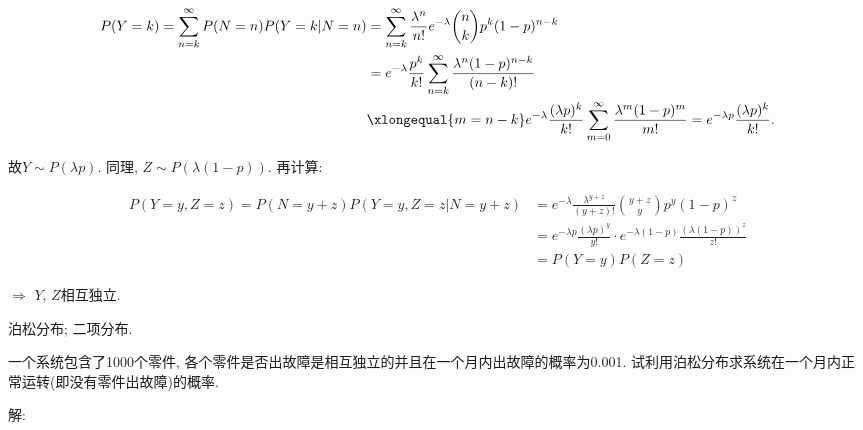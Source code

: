 \documentclass[standard]{ExBook}
\begin{document}
\begin{qitems}
    \begin{bbox}
\vspace{-2em}
\begin{center}
\begin{equation}
\begin{aligned}
    \nonumber
P(Y=k)=\sum\limits_{n=k}^{\infty}P(N=n)P(Y=k|N=n) & =\sum\limits_{n=k}^{\infty}\frac{\lambda^n}{n!}e^{-\lambda}\binom{n}{k}p^{k}(1-p)^{n-k}\\
 & =e^{-\lambda}\frac{p^k}{k!}\sum\limits_{n=k}^{\infty}\frac{\lambda^{n}(1-p)^{n-k}}{(n-k)!}\\
 & \xlongequal{m=n-k} e^{-\lambda}\frac{(\lambda p)^k}{k!}\sum\limits_{m=0}^{\infty}\frac{\lambda^{m}(1-p)^{m}}{m!} = e^{-\lambda p}\frac{(\lambda p)^{k}}{k!}.
\end{aligned}
\end{equation}
\end{center}
故$Y\sim P(\lambda p)$. 同理, $Z\sim P(\lambda(1-p))$.
再计算:
\vspace{-2em}
\begin{center}
\begin{equation}
\begin{aligned}
    \nonumber
P(Y=y,Z=z)=P(N=y+z)P(Y=y,Z=z|N=y+z)&=e^{-\lambda}\frac{\lambda^{y+z}}{(y+z)!}\binom{y+z}{y}p^y(1-p)^z\\
&=e^{-\lambda p}\frac{(\lambda p)^y}{y!}\cdot e^{-\lambda(1-p)}\frac{(\lambda(1-p))^z}{z!}\\
&=P(Y=y)P(Z=z)
\end{aligned}
\end{equation}
\end{center}
$\Longrightarrow$ $Y$, $Z$相互独立.

\textcolor{themeColor}{\selectfont {} 泊松分布; 二项分布.}
    \end{bbox}

\vspace{-5em}

    \begin{bbox}
    \begin{shaded}
        \qitem
一个系统包含了1000个零件, 各个零件是否出故障是相互独立的并且在一个月内出故障的概率为0.001. 试利用泊松分布求系统在一个月内正常运转(即没有零件出故障)的概率.
    \end{shaded}
    \end{bbox}

\vspace{-5em}

    \begin{bbox}
解: 


\end{bbox}
\end{qitems}
\end{document}
